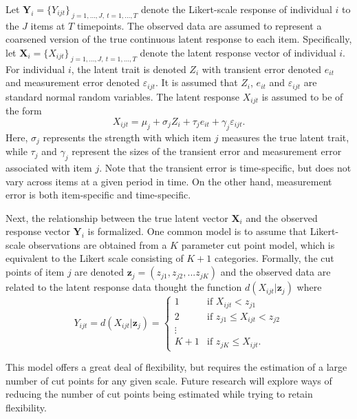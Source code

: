 \documentclass[12pt]{article}
\begin{document}
Let $\mathbf{Y}_{i} =\{Y_{ijt}\}_{\: j=1,\ldots,J, \: t=1,\ldots,T}$ denote the
Likert-scale response of individual $i$ to the $J$ items at $T$ timepoints.
The observed data are assumed to represent a coarsened version of the true continuous latent response to each item. Specifically,
let $\mathbf{X}_{i} =\{X_{ijt}\}_{\: j=1,\ldots,J, \: t=1,\ldots,T}$ denote the
latent response vector of individual $i$. For individual $i$, the latent
trait is denoted $Z_{i}$ with transient error denoted $e_{it}$ and
measurement error denoted $\varepsilon_{ijt}$. It is assumed that $Z_{i}$, $%
e_{it}$ and $\varepsilon_{ijt}$ are standard normal random variables. The
latent response $X_{ijt}$ is assumed to be of the form 
\begin{equation}  \label{model0}
X_{ijt}=\mu_j + \sigma_j Z_i + \tau_j e_{it} +\gamma_j \varepsilon_{ijt}.
\end{equation}
Here, $\sigma_{j}$ represents the strength with which item $j$ measures the true latent trait, while $\tau_{j}$ and $\gamma_{j}$ represent the sizes of the transient error and measurement error associated with item $j$. Note that the transient error is time-specific, but does not vary across items at a given period in time. On the other hand, measurement error is both item-specific and
time-specific.

Next, the relationship between the true latent vector $\mathbf{X}_{i}$ and
the observed response vector $\mathbf{Y}_{i}$ is formalized. One common model is to assume that Likert-scale observations are obtained from a $K$ parameter
cut point model, which is equivalent to the Likert scale consisting of $K+1$ categories. Formally, the cut points of item $j$ are denoted $\mathbf{z}_{j}=(z_{j1},z_{j2}, ... z_{jK})$ and the observed data are related to the latent response data thought the function $d(X_{ijt}| \mathbf{z}_{j} )$
where 
\begin{equation}  \label{truncation_model}
Y_{ijt} = d(X_{ijt} | \mathbf{z}_{j}) = \left\{ 
\begin{array}{ll}
1 & \text{if } X_{ijt} < z_{j1} \\ 
2 & \text{if } z_{j1} \leq X_{ijt} < z_{j2} \\ 
\vdots &  \\ 
K + 1 & \text{if } z_{jK} \leq X_{ijt}.%
\end{array}
\right.
\end{equation}

This model offers a great deal of flexibility, but requires the estimation
of a large number of cut points for any given scale. Future research will explore ways of reducing the number of cut points being estimated while trying to retain flexibility. 
\end{document}
